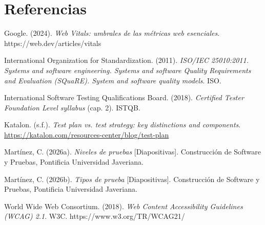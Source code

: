 \documentclass[11pt,a4paper]{article}
\begin{document}
\FloatBarrier
\section*{Referencias}

\begingroup
\setlength{\parindent}{-1.6em}
\setlength{\leftskip}{1.6em}
\setlength{\parskip}{7pt}

Google. (2024). \emph{Web Vitals: umbrales de las métricas web esenciales}.
https://web.dev/articles/vitals

International Organization for Standardization. (2011). \emph{ISO/IEC 25010:2011.
Systems and software engineering. Systems and software Quality Requirements and
Evaluation (SQuaRE). System and software quality models}. ISO.

International Software Testing Qualifications Board. (2018). \emph{Certified Tester
Foundation Level syllabus} (cap. 2). ISTQB.

Katalon. (s.f.). \emph{Test plan vs. test strategy: key distinctions and
components}. \url{https://katalon.com/resources-center/blog/test-plan}

Martínez, C. (2026a). \emph{Niveles de pruebas} [Diapositivas]. Construcción de
Software y Pruebas, Pontificia Universidad Javeriana.

Martínez, C. (2026b). \emph{Tipos de prueba} [Diapositivas]. Construcción de
Software y Pruebas, Pontificia Universidad Javeriana.

World Wide Web Consortium. (2018). \emph{Web Content Accessibility Guidelines
(WCAG) 2.1}. W3C. https://www.w3.org/TR/WCAG21/

\endgroup
\end{document}

